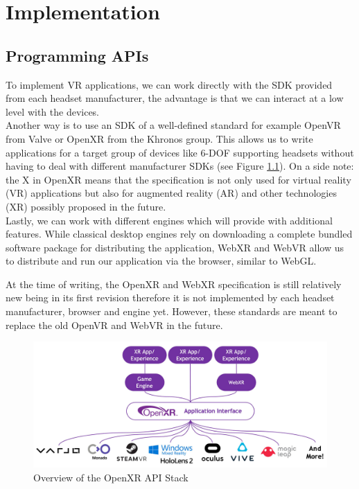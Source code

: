 \chapter{Implementation}
\label{chap:Impl}
\section{Programming APIs}

To implement VR applications, we can work directly with the SDK provided from each headset manufacturer, the advantage is that we can interact at a low level with the devices.\\ 
Another way is to use an SDK of a well-defined standard for example OpenVR from Valve or OpenXR from the Khronos group. This allows us to write applications for a target group of devices like 6-DOF supporting headsets without having to deal with different manufacturer SDKs (see Figure \ref{fig:openxr-overview}). On a side note: the X in OpenXR means that the specification is not only used for virtual reality (VR) applications but also for augmented reality (AR) and other technologies (XR) possibly proposed in the future.\\
Lastly, we can work with different engines which will provide with additional features. While classical desktop engines rely on downloading a complete bundled software package for distributing the application, WebXR and WebVR allow us to distribute and run our application via the browser, similar to WebGL.

At the time of writing, the OpenXR and WebXR specification is still relatively new being in its first revision therefore it is not implemented by each headset manufacturer, browser and engine yet. However, these standards are meant to replace the old OpenVR and WebVR in the future.

\begin{figure}[h]
    \centering
    \includegraphics[width=\textwidth]{graphics/openXR-overview.jpg}
    \caption{Overview of the OpenXR API Stack \cite{khronosGroupOpenXR}}
    \label{fig:openxr-overview}
\end{figure}

